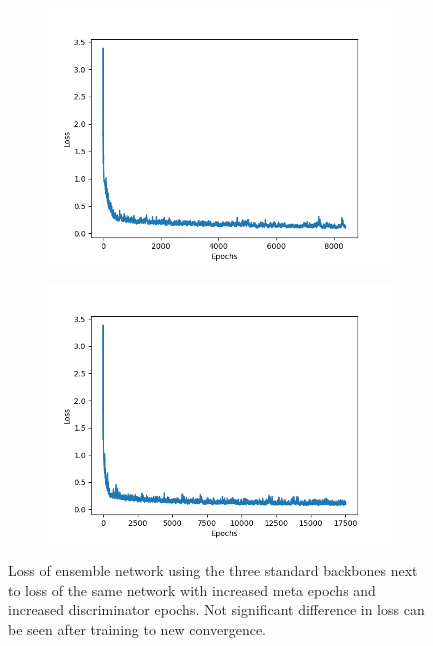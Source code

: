 \begin{figure}[ht]
    \captionsetup[subfigure]{justification=centering}
    \centering
    \begin{subfigure}[b]{0.45\textwidth}
        \centering
        \includegraphics[width=\textwidth]{figures/ensemble_losses/normal_ensemble_loss.png}

    \end{subfigure}
    \begin{subfigure}[b]{0.45\textwidth}
        \centering
        \includegraphics[width=\textwidth]{figures/ensemble_losses/long_ensemble_loss.png}

    \end{subfigure}
    

    \caption{Loss of ensemble network using the three standard backbones next to loss of the same network with increased meta epochs and increased discriminator epochs. Not significant difference 
             in loss can be seen after training to new convergence.}
    \label{fig:ensembleloss}
\end{figure}